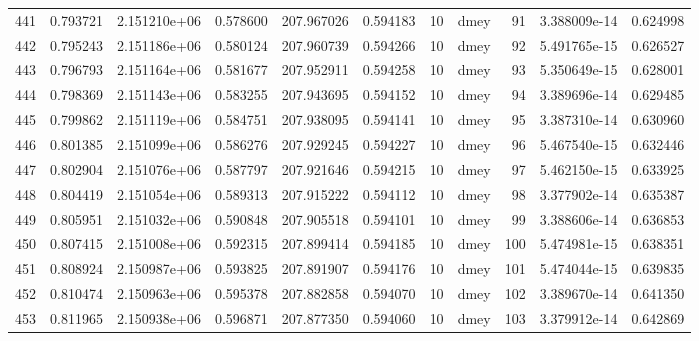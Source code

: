 \begin{tabular}{lrrrrrrlrrr}
441  &    0.793721 &        2.151210e+06 &  0.578600 &              207.967026 &    0.594183 &      10 &         dmey &     91 &   3.388009e-14 &      0.624998 \\
442  &    0.795243 &        2.151186e+06 &  0.580124 &              207.960739 &    0.594266 &      10 &         dmey &     92 &   5.491765e-15 &      0.626527 \\
443  &    0.796793 &        2.151164e+06 &  0.581677 &              207.952911 &    0.594258 &      10 &         dmey &     93 &   5.350649e-15 &      0.628001 \\
444  &    0.798369 &        2.151143e+06 &  0.583255 &              207.943695 &    0.594152 &      10 &         dmey &     94 &   3.389696e-14 &      0.629485 \\
445  &    0.799862 &        2.151119e+06 &  0.584751 &              207.938095 &    0.594141 &      10 &         dmey &     95 &   3.387310e-14 &      0.630960 \\
446  &    0.801385 &        2.151099e+06 &  0.586276 &              207.929245 &    0.594227 &      10 &         dmey &     96 &   5.467540e-15 &      0.632446 \\
447  &    0.802904 &        2.151076e+06 &  0.587797 &              207.921646 &    0.594215 &      10 &         dmey &     97 &   5.462150e-15 &      0.633925 \\
448  &    0.804419 &        2.151054e+06 &  0.589313 &              207.915222 &    0.594112 &      10 &         dmey &     98 &   3.377902e-14 &      0.635387 \\
449  &    0.805951 &        2.151032e+06 &  0.590848 &              207.905518 &    0.594101 &      10 &         dmey &     99 &   3.388606e-14 &      0.636853 \\
450  &    0.807415 &        2.151008e+06 &  0.592315 &              207.899414 &    0.594185 &      10 &         dmey &    100 &   5.474981e-15 &      0.638351 \\
451  &    0.808924 &        2.150987e+06 &  0.593825 &              207.891907 &    0.594176 &      10 &         dmey &    101 &   5.474044e-15 &      0.639835 \\
452  &    0.810474 &        2.150963e+06 &  0.595378 &              207.882858 &    0.594070 &      10 &         dmey &    102 &   3.389670e-14 &      0.641350 \\
453  &    0.811965 &        2.150938e+06 &  0.596871 &              207.877350 &    0.594060 &      10 &         dmey &    103 &   3.379912e-14 &      0.642869 \\

\end{tabular}

